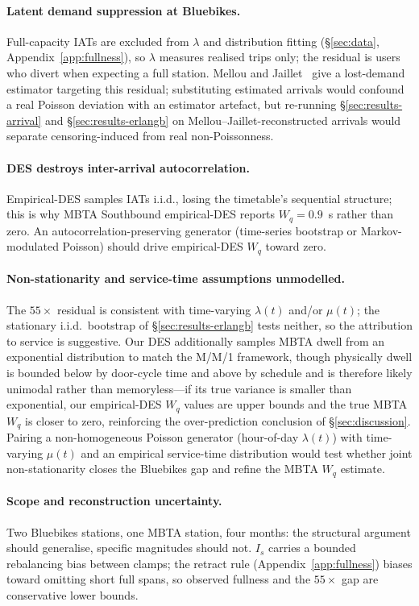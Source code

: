 \paragraph{Latent demand suppression at Bluebikes.} Full-capacity IATs are excluded from $\lambda$ and distribution fitting (\S\ref{sec:data}, Appendix~\ref{app:fullness}), so $\lambda$ measures realised trips only; the residual is users who divert when expecting a full station. Mellou and Jaillet~\cite{mellou2019} give a lost-demand estimator targeting this residual; substituting estimated arrivals would confound a real Poisson deviation with an estimator artefact, but re-running \S\ref{sec:results-arrival} and \S\ref{sec:results-erlangb} on Mellou--Jaillet-reconstructed arrivals would separate censoring-induced from real non-Poissonness.

\paragraph{DES destroys inter-arrival autocorrelation.} Empirical-DES samples IATs i.i.d., losing the timetable's sequential structure; this is why MBTA Southbound empirical-DES reports $W_q = 0.9$~s rather than zero. An autocorrelation-preserving generator (time-series bootstrap or Markov-modulated Poisson) should drive empirical-DES $W_q$ toward zero.

\paragraph{Non-stationarity and service-time assumptions unmodelled.} The $55\times$ residual is consistent with time-varying $\lambda(t)$ and/or $\mu(t)$; the stationary i.i.d.\ bootstrap of \S\ref{sec:results-erlangb} tests neither, so the attribution to service is suggestive. Our DES additionally samples MBTA dwell from an exponential distribution to match the M/M/1 framework, though physically dwell is bounded below by door-cycle time and above by schedule and is therefore likely unimodal rather than memoryless---if its true variance is smaller than exponential, our empirical-DES $W_q$ values are upper bounds and the true MBTA $W_q$ is closer to zero, reinforcing the over-prediction conclusion of \S\ref{sec:discussion}. Pairing a non-homogeneous Poisson generator (hour-of-day $\lambda(t)$) with time-varying $\mu(t)$ and an empirical service-time distribution would test whether joint non-stationarity closes the Bluebikes gap and refine the MBTA $W_q$ estimate.

\paragraph{Scope and reconstruction uncertainty.} Two Bluebikes stations, one MBTA station, four months: the structural argument should generalise, specific magnitudes should not. $I_s$ carries a bounded rebalancing bias between clamps; the retract rule (Appendix~\ref{app:fullness}) biases toward omitting short full spans, so observed fullness and the $55\times$ gap are conservative lower bounds.

